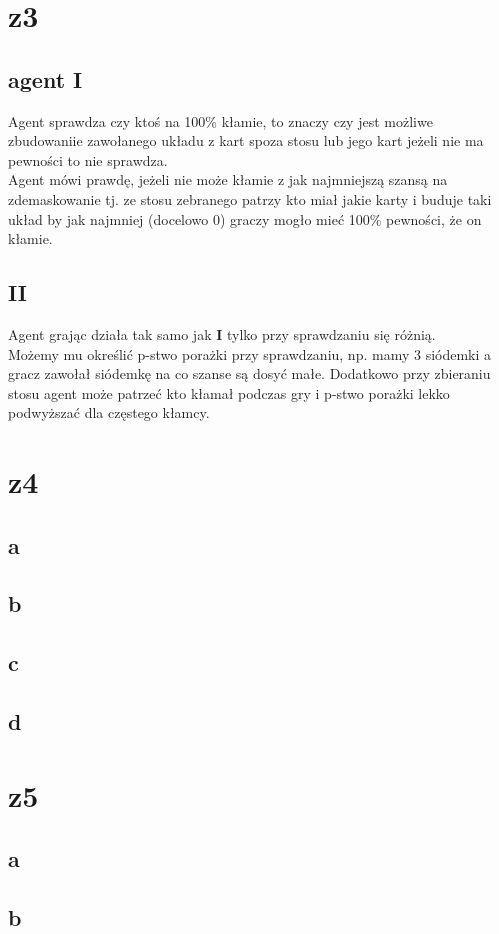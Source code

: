 \documentclass{article}
\begin{document}
\section{z3}
\subsection*{agent I}
Agent sprawdza czy ktoś na 100\% kłamie, to znaczy czy jest możliwe zbudowaniie zawołanego układu z kart spoza stosu lub jego kart jeżeli nie ma pewności to nie sprawdza. \\Agent mówi prawdę, jeżeli nie może kłamie z jak najmniejszą szansą na zdemaskowanie tj. ze stosu zebranego patrzy kto miał jakie karty i buduje taki układ by jak najmniej (docelowo 0) graczy mogło mieć 100\% pewności, że on kłamie.
\subsection*{II}
Agent grając działa tak samo jak \textbf{I} tylko przy sprawdzaniu się różnią.\\
Możemy mu określić p-stwo porażki przy sprawdzaniu, np. mamy 3 siódemki a gracz zawołał siódemkę na co szanse są dosyć małe. Dodatkowo przy zbieraniu stosu agent może patrzeć kto kłamał podczas gry i p-stwo porażki lekko podwyższać dla częstego kłamcy.
\section{z4}
\subsection*{a}
\subsection*{b}
\subsection*{c}
\subsection*{d}
\section{z5}
\subsection*{a}
\subsection*{b}
\end{document}
